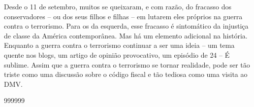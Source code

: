 \par
 
Desde o 11 de setembro, muitos se queixaram, e com razão, do fracasso dos conservadores – ou dos seus filhos e filhas – em lutarem eles próprios na guerra contra o terrorismo. Para os da esquerda, esse fracasso é sintomático da injustiça de classe da América contemporânea. Mas há um elemento adicional na história. Enquanto a guerra contra o terrorismo continuar a ser uma ideia – um tema quente nos blogs, um artigo de opinião provocativo, um episódio de
 {\color{blue} 24}  
– É sublime. Assim que a guerra contra o terrorismo se tornar realidade, pode ser tão triste como uma discussão sobre o código fiscal e tão tediosa como uma visita ao DMV.
 
\par
  
 
999999
